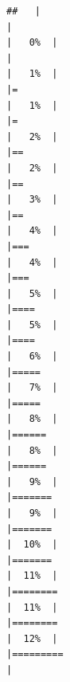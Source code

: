 \documentclass[
  english,
  man,a4paper,mask,floatsintext]{apa6}
\begin{document}
\begin{verbatim}
##   |                                                                              |                                                                      |   0%  |                                                                              |                                                                      |   1%  |                                                                              |=                                                                     |   1%  |                                                                              |=                                                                     |   2%  |                                                                              |==                                                                    |   2%  |                                                                              |==                                                                    |   3%  |                                                                              |==                                                                    |   4%  |                                                                              |===                                                                   |   4%  |                                                                              |===                                                                   |   5%  |                                                                              |====                                                                  |   5%  |                                                                              |====                                                                  |   6%  |                                                                              |=====                                                                 |   7%  |                                                                              |=====                                                                 |   8%  |                                                                              |======                                                                |   8%  |                                                                              |======                                                                |   9%  |                                                                              |=======                                                               |   9%  |                                                                              |=======                                                               |  10%  |                                                                              |=======                                                               |  11%  |                                                                              |========                                                              |  11%  |                                                                              |========                                                              |  12%  |                                                                              |=========                                                             |  
\end{verbatim}
\end{document}

